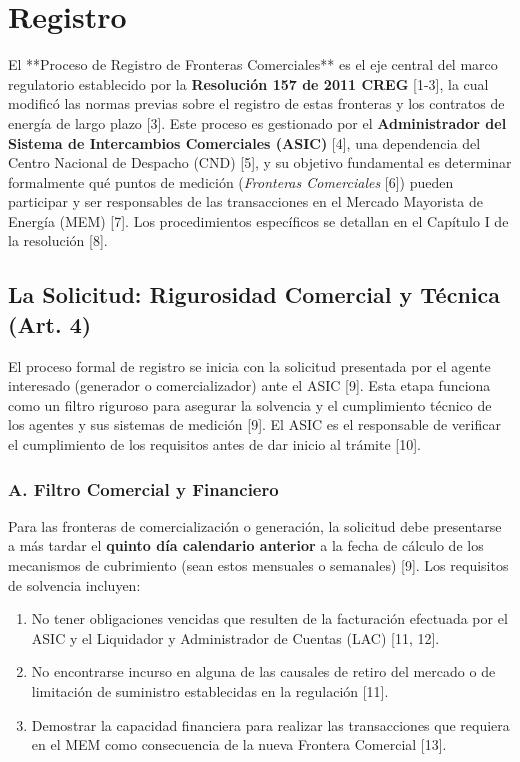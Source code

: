 \documentclass[a5paper]{book}%
\begin{document}
  
  \section{Registro}
  
  El **Proceso de Registro de Fronteras Comerciales** es el eje central del marco regulatorio establecido por la \textbf{Resolución 157 de 2011 CREG} [1-3], la cual modificó las normas previas sobre el registro de estas fronteras y los contratos de energía de largo plazo [3]. Este proceso es gestionado por el \textbf{Administrador del Sistema de Intercambios Comerciales (ASIC)} [4], una dependencia del Centro Nacional de Despacho (CND) [5], y su objetivo fundamental es determinar formalmente qué puntos de medición (\textit{Fronteras Comerciales} [6]) pueden participar y ser responsables de las transacciones en el Mercado Mayorista de Energía (MEM) [7]. Los procedimientos específicos se detallan en el Capítulo I de la resolución [8].
  
  \subsection{La Solicitud: Rigurosidad Comercial y Técnica (Art. 4\textdegree)}
  
  El proceso formal de registro se inicia con la solicitud presentada por el agente interesado (generador o comercializador) ante el ASIC [9]. Esta etapa funciona como un filtro riguroso para asegurar la solvencia y el cumplimiento técnico de los agentes y sus sistemas de medición [9]. El ASIC es el responsable de verificar el cumplimiento de los requisitos antes de dar inicio al trámite [10].
  
  \subsubsection*{A. Filtro Comercial y Financiero}
  Para las fronteras de comercialización o generación, la solicitud debe presentarse a más tardar el \textbf{quinto día calendario anterior} a la fecha de cálculo de los mecanismos de cubrimiento (sean estos mensuales o semanales) [9]. Los requisitos de solvencia incluyen:
  \begin{enumerate}
  	\item No tener obligaciones vencidas que resulten de la facturación efectuada por el ASIC y el Liquidador y Administrador de Cuentas (LAC) [11, 12].
  	\item No encontrarse incurso en alguna de las causales de retiro del mercado o de limitación de suministro establecidas en la regulación [11].
  	\item Demostrar la capacidad financiera para realizar las transacciones que requiera en el MEM como consecuencia de la nueva Frontera Comercial [13].
  \end{enumerate}
  
\end{document}

